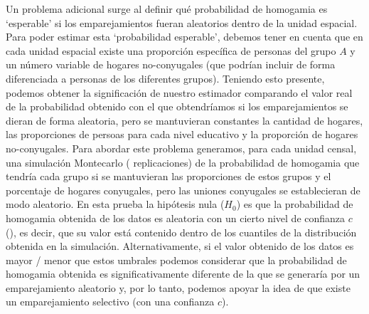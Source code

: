 \documentclass[
  spanish,
  a4paper,%
  chapterprefix=true,%
  DIV=calc,%
  twoside]{scrbook}%
\begin{document}
Un problema adicional surge al definir qué probabilidad de homogamia es
`esperable' si los emparejamientos fueran aleatorios dentro de la unidad
espacial. Para poder estimar esta `probabilidad esperable', debemos
tener en cuenta que en cada unidad espacial existe una proporción
específica de personas del grupo \(A\) y un número variable de hogares
no-conyugales (que podrían incluir de forma diferenciada a personas de
los diferentes grupos). Teniendo esto presente, podemos obtener la
significación de nuestro estimador comparando el valor real de la
probabilidad obtenido con el que obtendríamos si los emparejamientos se
dieran de forma aleatoria, pero se mantuvieran constantes la cantidad de
hogares, las proporciones de persoas para cada nivel educativo y la
proporción de hogares no-conyugales. Para abordar este problema
generamos, para cada unidad censal, una simulación Montecarlo
( replicaciones) de la probabilidad de homogamia que
tendría cada grupo si se mantuvieran las proporciones de estos grupos y
el porcentaje de hogares conyugales, pero las uniones conyugales se
establecieran de modo aleatorio. En esta prueba la hipótesis nula
(\(H_0\)) es que la probabilidad de homogamia obtenida de los datos es
aleatoria con un cierto nivel de confianza \(c\) (), es
decir, que su valor está contenido dentro de los cuantiles de la
distribución obtenida en la simulación. Alternativamente, si el valor
obtenido de los datos es mayor / menor que estos umbrales podemos
considerar que la probabilidad de homogamia obtenida es
significativamente diferente de la que se generaría por un
emparejamiento aleatorio y, por lo tanto, podemos apoyar la idea de que
existe un emparejamiento selectivo (con una confianza \(c\)).
\end{document}
